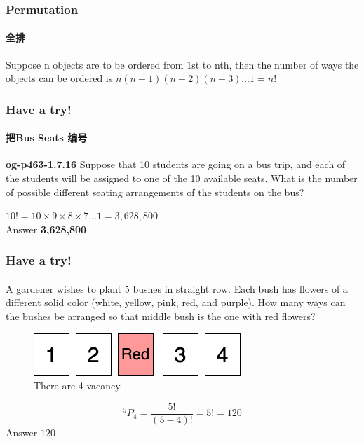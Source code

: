 \documentclass[
	11pt, %
]{beamer}
\begin{document}

\begin{frame}
	\frametitle{Permutation} %
	\framesubtitle{全排}
	\begin{definition}
		Suppose n objects are to be ordered from 1st to nth, then
 the number of ways the objects can be ordered is $n(n-1)(n-2)(n-3)\ldots1=n!$ 
	\end{definition}
\end{frame}


\begin{frame}
\frametitle{Have a try!}
\framesubtitle{把Bus Seats 编号}
\textbf{og-p463-1.7.16} Suppose that 10 students are going on a bus trip, and each
of the students will be assigned to one of the 10 available seats. What is  the
number of possible different seating arrangements of the students on the
bus?


\bigskip
\pause
$10! = 10 \times 9 \times 8 \times 7 \ldots 1 = 3,628,800  $\\
\bigskip\pause
Answer \textbf{3,628,800} \pause 
\end{frame}


\begin{frame}
	\frametitle{Have a try!}
	\framesubtitle{}
A gardener wishes to plant 5 bushes in straight row. Each bush has flowers of a
different solid color (white, yellow, pink, red, and purple). How many ways can the
bushes be arranged so that middle bush is the one with red flowers?
	\begin{figure}
		\includegraphics[width=0.3\linewidth]{Bushes.png}
		\caption{There are 4 vacancy.}
	\end{figure}
\begin{equation*}
	^5P_4 =\frac{5!}{(5-4)!} = 5! = 120
\end{equation*}
\bigskip
\pause
Answer \textbf{$120$}
\bigskip

\end{frame}

\end{document}
